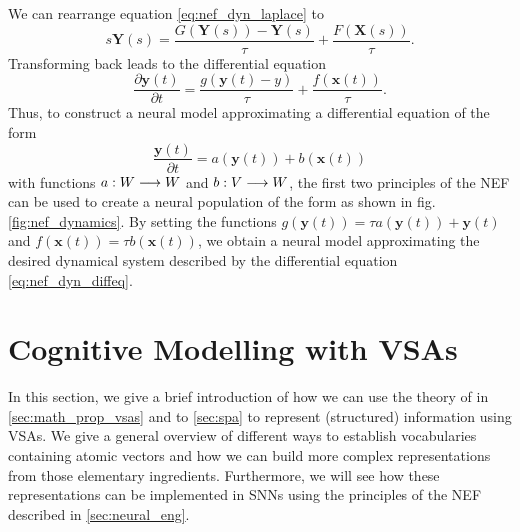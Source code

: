 We can rearrange equation \ref{eq:nef_dyn_laplace} to
\begin{equation}
s\mathbf{Y}(s) = \frac{G(\mathbf{Y}(s))-\mathbf{Y}(s)}{\tau} + \frac{F(\mathbf{X}(s))}{\tau}.
\end{equation}
Transforming back leads to the differential equation
\begin{equation}
\frac{\partial \mathbf{y}(t)}{\partial t} = \frac{g(\mathbf{y}(t)-y)}{\tau} + \frac{f(\mathbf{x}(t))}{\tau}.
\end{equation}
Thus, to construct a neural model approximating a differential equation of the form
\begin{equation}
\frac{\mathbf{y}(t)}{\partial t} = a(\mathbf{y}(t)) + b(\mathbf{x}(t))
\label{eq:nef_dyn_diffeq}
\end{equation}
with functions $a: W \longrightarrow W$ and $b: V \longrightarrow W$, the first two principles of the \ac{NEF} can be used to create a neural population of the form as shown in fig. \ref{fig:nef_dynamics}.
By setting the functions $g(\mathbf{y}(t))=\tau a(\mathbf{y}(t)) + \mathbf{y}(t)$ and $f(\mathbf{x}(t))=\tau b(\mathbf{x}(t))$, we obtain a neural model approximating the desired dynamical system described by the differential equation \ref{eq:nef_dyn_diffeq}.


\section{Cognitive Modelling with \aclp{VSA}}
In this section, we give a brief introduction of how we can use the theory of in \ref{sec:math_prop_vsas} and to \ref{sec:spa} to represent (structured) information using \acp{VSA}.
We give a general overview of different ways to establish vocabularies containing atomic vectors and how we can build more complex representations from those elementary ingredients.
Furthermore, we will see how these representations can be implemented in \acp{SNN} using the principles of the \ac{NEF} described in \ref{sec:neural_eng}.
